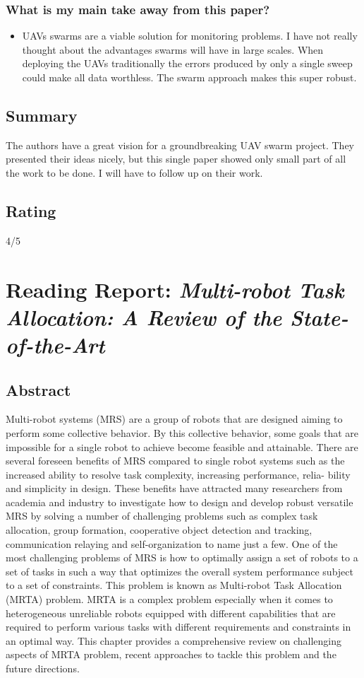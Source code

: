\subsubsection*{What is my main take away from this paper?}
\begin{itemize}
    \item UAVs swarms are a viable solution for monitoring problems. I have not really thought about the advantages swarms will have in large scales. When deploying the UAVs traditionally the errors produced by only a single sweep could make all data worthless. The swarm approach makes this super robust.
\end{itemize}

\subsection*{Summary}
The authors have a great vision for a groundbreaking UAV swarm project. They presented their ideas nicely, but this single paper showed only small part of all the work to be done. I will have to follow up on their work.

\subsection*{Rating}
4/5



\section{Reading Report: \emph{Multi-robot Task Allocation: A Review of the State-of-the-Art}}
\cite{Khamis2015}

\subsection*{Abstract}
Multi-robot systems (MRS) are a group of robots that are designed
aiming to perform some collective behavior. By this collective behavior, some goals
that are impossible for a single robot to achieve become feasible and attainable.
There are several foreseen benefits of MRS compared to single robot systems such
as the increased ability to resolve task complexity, increasing performance, relia-
bility and simplicity in design. These benefits have attracted many researchers from
academia and industry to investigate how to design and develop robust versatile MRS
by solving a number of challenging problems such as complex task allocation, group
formation, cooperative object detection and tracking, communication relaying and
self-organization to name just a few. One of the most challenging problems of MRS
is how to optimally assign a set of robots to a set of tasks in such a way that optimizes
the overall system performance subject to a set of constraints. This problem is known
as Multi-robot Task Allocation (MRTA) problem. MRTA is a complex problem
especially when it comes to heterogeneous unreliable robots equipped with different
capabilities that are required to perform various tasks with different requirements
and constraints in an optimal way. This chapter provides a comprehensive review on
challenging aspects of MRTA problem, recent approaches to tackle this problem and
the future directions.

